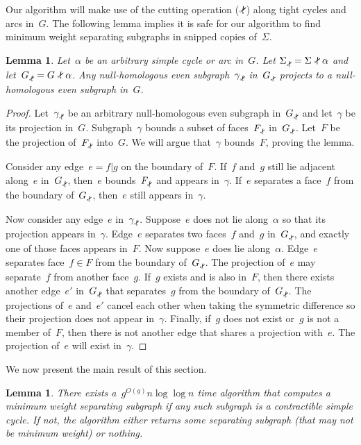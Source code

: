 \documentclass[11pt,twoside]{article}
\def\snip{\mathbin{\raisebox{0.15ex}{\rotatebox[origin=c]{60}{\Rightscissors}\!}}}
\def\subsnip{\mathbin{\raisebox{0.15ex}{\rotatebox[origin=c]{60}{\footnotesize\Rightscissors}\!}}}
\def\Gsnip{\mathord{G_{\subsnip}}}
\def\Sigmasnip{\mathord{\Sigma_{\subsnip}}}
\def\gammasnip{\mathord{\gamma_{\subsnip}}}
\def\snip{\mathbin{\raisebox{0.15ex}{\rotatebox[origin=c]{60}{\Rightscissors}\!}}}
\newtheorem{lemma}[theorem]{Lemma}
\begin{document}
{Our algorithm will make use of the cutting operation ($\snip$) along tight cycles and arcs in~$G$.
\note{TODO: Define $\snip$ in the prelims.}
The following lemma implies it is safe for our algorithm to find minimum weight separating subgraphs in snipped copies of~$\Sigma$.
\begin{lemma}
\label{lem:global_null-homologous-projections}
Let~$\alpha$ be an arbitrary simple cycle or arc in~$G$. Let
${\Sigmasnip = \Sigma \snip \alpha}$ and let~$\Gsnip = G \snip \alpha$. Any null-homologous even subgraph~$\gammasnip$ in~$\Gsnip$ projects to a null-homologous even subgraph in~$G$.
\end{lemma}
\begin{proof}
Let~$\gammasnip$ be an arbitrary null-homologous even subgraph in~$\Gsnip$ and let~$\gamma$ be its projection in~$G$.
Subgraph~$\gamma$ bounds a subset of faces~$F_{\subsnip}$ in~$\Gsnip$. 
Let~$F$ be the projection of~$F_{\subsnip}$ into~$G$.
We will argue that~$\gamma$ bounds~$F$, proving the lemma.

Consider any edge~$e = f | g$ on the boundary of~$F$. If~$f$ and~$g$ still lie adjacent along~$e$ in~$\Gsnip$, then~$e$ bounds~$F_{\subsnip}$ and appears in~$\gamma$. If~$e$ separates a face~$f$ from the boundary of~$\Gsnip$, then~$e$ still appears in~$\gamma$.

Now consider any edge~$e$ in~$\gammasnip$. Suppose~$e$ does not lie along~$\alpha$ so that its projection appears in~$\gamma$. Edge~$e$ separates two faces~$f$ and~$g$ in~$\Gsnip$, and exactly one of those faces appears in~$F$. Now suppose~$e$ does lie along~$\alpha$. Edge~$e$ separates face~$f \in F$ from the boundary of~$\Gsnip$. The projection of~$e$ may separate~$f$ from another face~$g$. If~$g$ exists and is also in~$F$, then there exists another edge~$e'$ in~$\Gsnip$ that separates~$g$ from the boundary of~$\Gsnip$. The projections of~$e$ and~$e'$ cancel each other when taking the symmetric difference so their projection does not appear in~$\gamma$. Finally, if~$g$ does not exist or~$g$ is not a member of~$F$, then there is not another edge that shares a projection with~$e$. The projection of~$e$ will exist in~$\gamma$.
\end{proof}

We now present the main result of this section.
\begin{lemma}
\label{lem:contractible-alg}
There exists a~$g^{O(g)} n \log \log n$ time algorithm that computes a minimum weight separating subgraph if any such subgraph is a contractible simple cycle. If not, the algorithm either returns some separating subgraph (that may not be minimum weight) or nothing.
\end{lemma}

}
\end{document}
